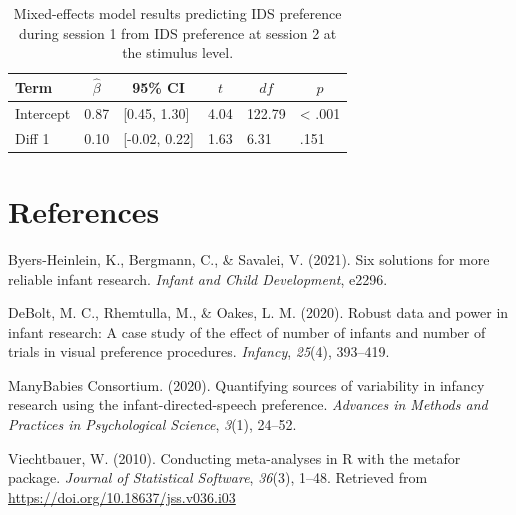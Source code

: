 \documentclass[
  man, donotrepeattitle,floatsintext]{apa6}
\newlength{\cslhangindent}
\newlength{\cslentryspacingunit} %
\newenvironment{CSLReferences}[2] %
 {%
  \setlength{\parindent}{0pt}
  \ifodd #1
  \let\oldpar\par
  \def\par{\hangindent=\cslhangindent\oldpar}
  \fi
  \setlength{\parskip}{#2\cslentryspacingunit}
 }%
 {}
\begin{document}
\begin{table}[tbp]

\begin{center}
\begin{threeparttable}

\caption{\label{tab:unnamed-chunk-13}Mixed-effects model results predicting IDS preference during session 1 from IDS preference at session 2 at the stimulus level.}

\begin{tabular}{llllll}
\toprule
Term & \multicolumn{1}{c}{$\hat{\beta}$} & \multicolumn{1}{c}{95\% CI} & \multicolumn{1}{c}{$t$} & \multicolumn{1}{c}{$\mathit{df}$} & \multicolumn{1}{c}{$p$}\\
\midrule
Intercept & 0.87 & {}[0.45, 1.30] & 4.04 & 122.79 & < .001\\
Diff 1 & 0.10 & {}[-0.02, 0.22] & 1.63 & 6.31 & .151\\
\bottomrule
\end{tabular}

\end{threeparttable}
\end{center}

\end{table}

\newpage

\hypertarget{references}{%
\section{References}\label{references}}

\begingroup
\setlength{\parindent}{-0.5in}
\setlength{\leftskip}{0.5in}

\hypertarget{refs}{}
\begin{CSLReferences}{1}{0}
\leavevmode{}%
Byers-Heinlein, K., Bergmann, C., \& Savalei, V. (2021). Six solutions for more reliable infant research. \emph{Infant and Child Development}, e2296.

\leavevmode{}%
DeBolt, M. C., Rhemtulla, M., \& Oakes, L. M. (2020). Robust data and power in infant research: A case study of the effect of number of infants and number of trials in visual preference procedures. \emph{Infancy}, \emph{25}(4), 393--419.

\leavevmode{}%
ManyBabies Consortium. (2020). Quantifying sources of variability in infancy research using the infant-directed-speech preference. \emph{Advances in Methods and Practices in Psychological Science}, \emph{3}(1), 24--52.

\leavevmode{}%
Viechtbauer, W. (2010). Conducting meta-analyses in {R} with the {metafor} package. \emph{Journal of Statistical Software}, \emph{36}(3), 1--48. Retrieved from \url{https://doi.org/10.18637/jss.v036.i03}

\end{CSLReferences}

\endgroup
\end{document}
